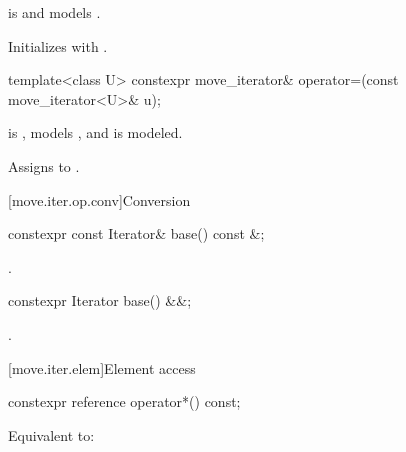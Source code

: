 \begin{itemdescr}
\pnum
\constraints
{} is  and
 models .

\pnum
\effects
Initializes  with .
\end{itemdescr}

%
\begin{itemdecl}
template<class U> constexpr move_iterator& operator=(const move_iterator<U>& u);
\end{itemdecl}

\begin{itemdescr}
\pnum
\constraints
{} is ,
 models , and
 is modeled.

\pnum
\effects
Assigns  to
.
\end{itemdescr}

[move.iter.op.conv]{Conversion}

%
\begin{itemdecl}
constexpr const Iterator& base() const &;
\end{itemdecl}

\begin{itemdescr}
\pnum
\returns
{}.
\end{itemdescr}

%
\begin{itemdecl}
constexpr Iterator base() &&;
\end{itemdecl}

\begin{itemdescr}
\pnum
\returns
{}.
\end{itemdescr}

[move.iter.elem]{Element access}

%
\begin{itemdecl}
constexpr reference operator*() const;
\end{itemdecl}

\begin{itemdescr}
\pnum
\effects
Equivalent to: 
\end{itemdescr}

